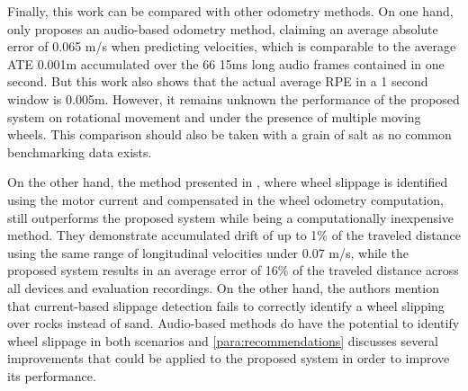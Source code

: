 Finally, this work can be compared with other odometry methods. On one hand,
only \cite{marchegiani2018a} proposes an audio-based odometry method, claiming
an average absolute error of 0.065 m/s when predicting velocities, which is
comparable to the average ATE 0.001m accumulated over the 66 15ms long audio
frames contained in one second. But this work also shows that the actual
average RPE in a 1 second window is 0.005m. However, it remains unknown the
performance of the proposed system on rotational movement and under the
presence of multiple moving wheels. This comparison should also be taken with a
grain of salt as no common benchmarking data exists.

On the other hand, the method presented in \cite{Ojeda2006}, where wheel
slippage is identified using the motor current and compensated in the wheel
odometry computation, still outperforms the proposed system while being a
computationally inexpensive method. They demonstrate accumulated drift of up to
1\% of the traveled distance using the same range of longitudinal velocities
under 0.07 m/s, while the proposed system results in an average error of
16\% of the traveled distance across all devices and evaluation recordings.
On the other hand, the authors mention that current-based slippage detection
fails to correctly identify a wheel slipping over rocks instead of sand.
Audio-based methods do have the potential to identify wheel slippage in both
scenarios and \cref{para:recommendations} discusses several improvements that
could be applied to the proposed system in order to improve its performance.